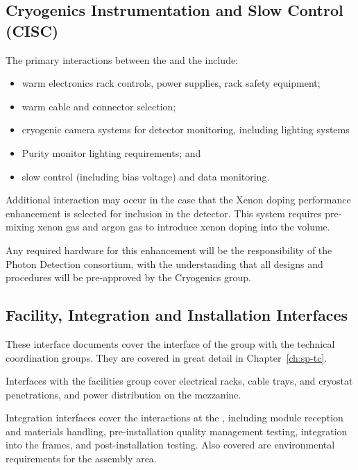 \subsection{Cryogenics Instrumentation and Slow Control (CISC)}
\label{sec:fdsp-pd-intfc-xeon}

The primary interactions between the  and the  include:

\begin{itemize}
    \item warm electronics rack controls, power supplies, rack safety equipment;
    \item warm cable and connector selection;
    \item cryogenic camera systems for detector monitoring, including lighting systems
    \item Purity monitor lighting requirements; and
    \item {} slow control (including bias voltage) and data monitoring.
\end{itemize}

Additional interaction may occur in the case that the Xenon doping performance enhancement is selected for inclusion in the detector.  This system requires pre-mixing xenon gas and argon gas to introduce xenon doping into the \lar volume. 


Any required hardware for this enhancement will be the responsibility of the Photon Detection consortium, with the understanding that all designs and procedures will be pre-approved by the Cryogenics group. 


\subsection{Facility, Integration and Installation Interfaces}

These interface documents cover the interface of the  group with the technical coordination groups.  They are covered in great detail in Chapter~\ref{ch:sp-tc}.


Interfaces with the facilities group cover electrical racks, cable trays, and cryostat penetrations, and power distribution on the mezzanine.

Integration interfaces cover the interactions at the , including  module reception and materials handling, pre-installation quality management testing, integration into the  frames, and post-installation testing.  Also covered are environmental requirements for the assembly area.

